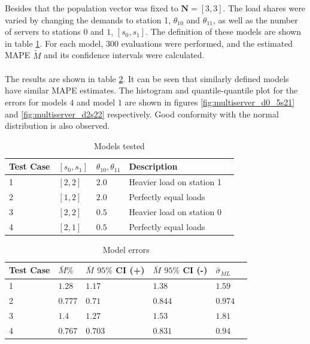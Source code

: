 Besides that the population vector was fixed to \(\mathbf{N} = [3,3]\). The load shares were varied by changing the demands to station 1, \(\theta_{10}\) and \(\theta_{11}\), as well as the number of servers to stations \(0\) and \(1\), \([s_0, s_1]\). The definition of these models are shown in table \ref{tab:specific_models_evaluate_MS}. For each model, \(300\) evaluations were performed, and the estimated MAPE \(\tilde{M}\) and its confidence intervals were calculated. 
\\\\
The results are shown in table \ref{tab:specific_models_error_MS}. It can be seen that similarly defined models have similar MAPE estimates. The histogram and quantile-quantile plot for the errors for models \(4\) and model \(1\) are shown in figures \ref{fig:multiserver_d0_5s21} and \ref{fig:multiserver_d2s22} respectively. Good conformity with the normal distribution is also observed.

\begin{table}[!htb] 
\begin{center}
\begin{tabular}{@{}lllll@{}}
\toprule
 Test Case &  \([s_0, s_1]\) & \(\theta_{10}, \theta_{11}\) & Description \\ \midrule
 1 & \([2, 2]\) & \(2.0\) & Heavier load on station 1 \\
 2 & \([1, 2]\) & \(2.0\) & Perfectly equal loads\\
 3 & \([2, 2]\) & \(0.5\) & Heavier load on station 0 \\
 4 & \([2, 1]\) & \(0.5\) & Perfectly equal loads \\ \bottomrule
\end{tabular}
\end{center}
\caption{Models tested}
\label{tab:specific_models_evaluate_MS}
\end{table} 

\begin{table}[!htb] 
\begin{center}
\begin{tabular}{@{}llllll@{}}
\toprule
 Test Case & \(\bar{M} \%\) & \(\bar{M}\) \(95\%\) CI (+) & \(\bar{M}\) \(95\%\) CI (-) & \(\hat{\sigma}_{ML}\)\\ \midrule
    1 &\(1.28\) & \(1.17\) & \(1.38\) & \(1.59\) &  \\ 
    2 &\(0.777\) & \(0.71\) & \(0.844\) & \(0.974\) &  \\ 
    3 &\(1.4\) & \(1.27\) & \(1.53\) & \(1.81\) &  \\ 
    4 &\(0.767\) & \(0.703\) & \(0.831\) & \(0.94\) &  \\  \bottomrule
\end{tabular}
\end{center}
\caption{Model errors}
\label{tab:specific_models_error_MS}
\end{table}
 
